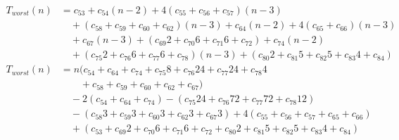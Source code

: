 \begin{subequations}
\label{eq:analyse-argetcontour-distance}
\begin{align}
\label{eq:analyse-argetcontour-distance-1}
T_{worst}(n)& =
c_{53}
 + c_{54}(n-2)
 + 4(c_{55} + c_{56} + c_{57})(n-3)
\\
& \quad
 + (c_{58} + c_{59} + c_{60} + c_{62})(n-3)
 + c_{64}(n-2)
 + 4(c_{65} + c_{66})(n-3)
\nonumber \\
& \quad
 + c_{67}(n-3)
 + (c_{69}2 + c_{70}6 + c_{71}6 + c_{72})
 + c_{74}(n-2)
\nonumber \\
& \quad
 + (c_{75}2 + c_{76}6 + c_{77}6 + c_{78})(n-3)
 + (c_{80}2 + c_{81}5 + c_{82}5 + c_{83}4 + c_{84})
\nonumber \\
\label{eq:analyse-argetcontour-distance-2}
T_{worst}(n)& =
n(c_{54} + c_{64} + c_{74} + c_{75}8 + c_{76}24 + c_{77}24 + c_{78}4
\\
& \quad \quad
 + c_{58} + c_{59} + c_{60} + c_{62} + c_{67})
\nonumber \\
& \quad
- 2(c_{54} + c_{64} + c_{74})
- (c_{75}24 + c_{76}72 + c_{77}72 + c_{78}12)
\nonumber \\
& \quad
- (c_{58}3 + c_{59}3 + c_{60}3 + c_{62}3 + c_{67}3)
+ 4(c_{55} + c_{56} + c_{57} + c_{65} + c_{66})
\nonumber \\
& \quad
+ (c_{53} + c_{69}2 + c_{70}6 + c_{71}6 + c_{72} + c_{80}2 + c_{81}5 + c_{82}5 + c_{83}4 + c_{84})
\nonumber
\end{align}
\end{subequations}
